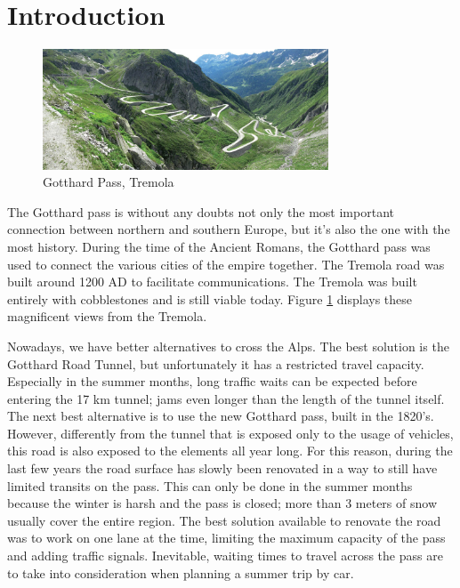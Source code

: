 \documentclass[11pt,a4paper,parskip=half-]{article}
\begin{document}

\section{Introduction}
\begin{figure}
\vspace{-4mm}
\includegraphics[width=8.5cm]{Gotthard_pass}
\vspace*{-8mm}
\caption{Gotthard Pass, Tremola}
\label{wrap-fig:Gotthard_Pass}
\vspace{-1mm}
\end{figure}
The Gotthard pass is without any doubts not only the most important connection between northern and southern Europe, but it's also the one with the most history. During the time of the Ancient Romans, the Gotthard pass was used to connect the various cities of the empire together. The Tremola road was built around 1200 AD to facilitate communications. The Tremola was built entirely with cobblestones and is still viable today. Figure \ref{wrap-fig:Gotthard_Pass} displays these magnificent views from the Tremola. 


Nowadays, we have better alternatives to cross the Alps. The best solution is the Gotthard Road Tunnel, but unfortunately it has a restricted travel capacity. Especially in the summer months, long traffic waits can be expected before entering the 17 km tunnel; jams even longer than the length of the tunnel itself. The next best alternative is to use the new Gotthard pass, built in the 1820’s. However, differently from the tunnel that is exposed only to the usage of vehicles, this road is also exposed to the elements all year long. For this reason, during the last few years the road surface has slowly been renovated in a way to still have limited transits on the pass. This can only be done in the summer months because the winter is harsh and the pass is closed; more than 3 meters of snow usually cover the entire region. The best solution available to renovate the road was to work on one lane at the time, limiting the maximum capacity of the pass and adding traffic signals. Inevitable, waiting times to travel across the pass are to take into consideration when planning a summer trip by car. 
\end{document}
